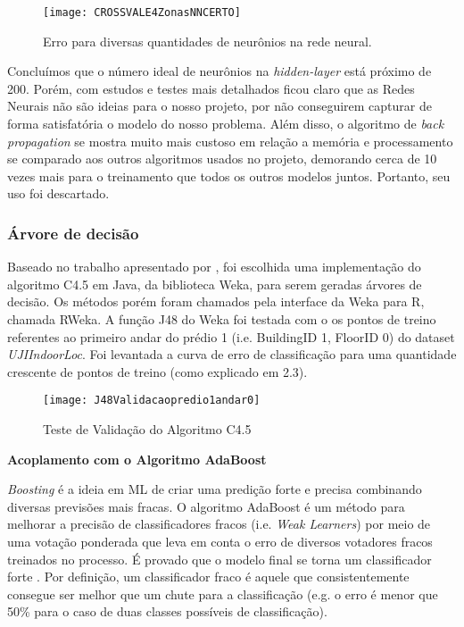 \begin{figure}[H]
	\centering
	\caption{Erro para diversas quantidades de neurônios na rede neural.}
  \texttt{[image: CROSSVALE4ZonasNNCERTO]}
\label{fig:crossNN}

\end{figure}




Concluímos que o número ideal de neurônios na  \textit{hidden-layer} está próximo de 200. Porém, com estudos e testes mais detalhados ficou claro que as Redes Neurais não são ideias para o nosso projeto, por não conseguirem capturar de forma satisfatória o modelo do nosso problema. Além disso, o algoritmo de \textit{back propagation} se mostra muito mais custoso em relação a memória e processamento se comparado aos outros algoritmos usados no projeto, demorando cerca de 10 vezes mais para o treinamento que todos os outros modelos juntos. Portanto, seu uso foi descartado.

\subsubsection{Árvore de decisão}


Baseado no trabalho apresentado por \cite{comparative}, foi escolhida uma implementação do algoritmo C4.5 \cite{quinlan} em Java, da biblioteca Weka, para serem geradas árvores de decisão. Os métodos porém foram chamados pela interface da Weka para R, chamada RWeka.
A função J48 do Weka foi testada com o os pontos de treino referentes ao primeiro andar do prédio 1 (i.e. BuildingID 1, FloorID 0)  do dataset \textit{UJIIndoorLoc}. Foi levantada a curva de erro de classificação para uma quantidade crescente de pontos de treino (como explicado em 2.3).


\begin{figure}[H]
\centering
\caption{Teste de Validação do Algoritmo C4.5}
 \texttt{[image: J48Validacaopredio1andar0]}
\label{fig:validationC4.5}
\end{figure}
\setcounter{secnumdepth}{4}

\textbf{Acoplamento com o Algoritmo AdaBoost}\\
\par \textit{Boosting} é a ideia em ML de criar uma predição forte e precisa combinando diversas previsões mais fracas. O algoritmo AdaBoost \cite{adaboost} é um método para melhorar a precisão de classificadores fracos (i.e. \textit{Weak Learners}) por meio de uma votação ponderada que leva em conta o erro de diversos votadores fracos treinados no processo. É provado que o modelo final se torna um classificador forte \cite{explainingadaboost}. Por definição, um classificador fraco é aquele que consistentemente consegue ser melhor que um chute para a classificação (e.g. o erro é menor que 50\% para o caso de duas classes possíveis de classificação).

